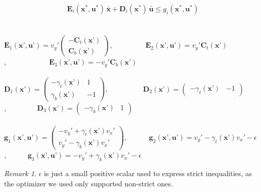 \documentclass[12,twoside]{TFG-GM}
\theoremstyle{definition}
\theoremstyle{remark}
\newtheorem{remark}[theorem]{Remark}
\newcommand*\diff[1]{\bar{#1}}
\begin{document}
\begin{equation} \label{eq:condensed_cone_linear}
\textbf{E}_i(\textbf{x}^*, \textbf{u}^*)\, \diff{\textbf{x}} + \textbf{D}_i(\textbf{x}^*)\, \diff{\textbf{u}} \leq g_i(\textbf{x}^*, \textbf{u}^*)
\end{equation} \\ \\
$\textbf{E}_1(\textbf{x'}, \textbf{u'}) = v_y' \begin{pmatrix}
-\textbf{C}_t(\textbf{x'}) \\
\textbf{C}_b(\textbf{x'})
\end{pmatrix}$,\,\,\,\,\,\,\,\,\,\,\,\,\,\,\,\,\,\,\,\,\,\,\,\,\,\, $\textbf{E}_2(\textbf{x'}, \textbf{u'}) = v_y' \textbf{C}_t(\textbf{x'})$,\,\,\,\,\,\,\,\,\,\,\,\,\,\,\,\,\,\,\,\,\,\,\,\,\,\,\,\,\,\,\,\,\,\, $\textbf{E}_3(\textbf{x'}, \textbf{u'}) = -v_y' \textbf{C}_b(\textbf{x'})$ \\ \\
$\textbf{D}_1(\textbf{x'}) = \begin{pmatrix}
-\gamma_t(\textbf{x'}) & 1 \\
\gamma_b(\textbf{x'}) & -1
\end{pmatrix}$,\,\,\,\,\,\,\,\,\,\,\,\,\,\,\,\,\,\,\,\,\,\,\,\,\,\,\,\, $\textbf{D}_2(\textbf{x'}) = \begin{pmatrix}
-\gamma_t(\textbf{x'}) & -1
\end{pmatrix}$,\,\,\,\,\,\,\,\,\,\,\,\,\,\,\,\,\,\,\,\,\,\,\,\, $\textbf{D}_3(\textbf{x'}) = \begin{pmatrix}
-\gamma_b(\textbf{x'}) & 1
\end{pmatrix}$ \\ \\
$\textbf{g}_1(\textbf{x'}, \textbf{u'}) = \begin{pmatrix}
-v_y' + \gamma_t(\textbf{x'}) v_x'\\
 v_y' - \gamma_b(\textbf{x'}) v_x'
\end{pmatrix}$,\,\,\,\,\,\,\,\,\,\,\,\,\,\,\,\,\, $\textbf{g}_2(\textbf{x'}, \textbf{u'}) = v_y' - \gamma_t(\textbf{x'}) v_x' - \epsilon$,\,\,\,\,\,\,\,\,\,\,\,\,\,\,\,\, $\textbf{g}_3(\textbf{x'}, \textbf{u'}) = -v_y' + \gamma_b(\textbf{x'}) v_x' - \epsilon$ \\

\begin{remark}
$\epsilon$ is just a small positive scalar used to express strict inequalities, as the optimizer we used only supported non-strict ones.
\end{remark}
\end{document}

